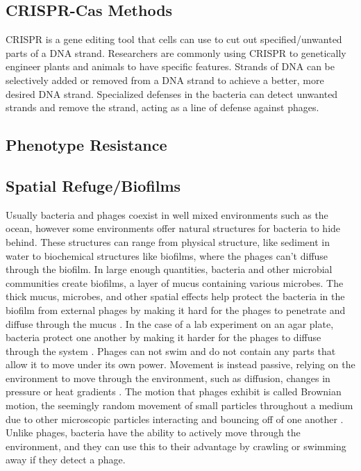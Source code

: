 \subsection{CRISPR-Cas Methods}
CRISPR is a gene editing tool that cells can use to cut out specified/unwanted parts of a DNA strand. 
Researchers are commonly using CRISPR to genetically engineer plants and animals to have specific features. 
Strands of DNA can be selectively added or removed from a DNA strand to achieve a better, more desired DNA strand. 
Specialized defenses in the bacteria can detect unwanted strands and remove the strand, acting as a line of defense against phages. 

\subsection{Phenotype Resistance}

\subsection{Spatial Refuge/Biofilms} 
Usually bacteria and phages coexist in well mixed environments such as the ocean, however some environments offer natural structures for bacteria to hide behind. 
These structures can range from physical structure, like sediment in water to biochemical structures like biofilms, where the phages can't diffuse through the biofilm. 
In large enough quantities, bacteria and other microbial communities create biofilms, a layer of mucus containing various microbes. 
The thick mucus, microbes, and other spatial effects help protect the bacteria in the biofilm from external phages by making it hard for the phages to penetrate and diffuse through the mucus \cite{abedonPhageDelayEnhancing2017}. 
In the case of a lab experiment on an agar plate, bacteria protect one another by making it harder for the phages to diffuse through the system \cite{eriksenGrowingMicrocolonyCan2018}. \newline
Phages can not swim and do not contain any parts that allow it to move under its own power. 
Movement is instead passive, relying on the environment to move through the environment, such as diffusion, changes in pressure or heat gradients \cite{lohrmannInfluenceBacterialSwimming2024}. 
The motion that phages exhibit is called Brownian motion, the seemingly random movement of small particles throughout a medium due to other microscopic particles interacting and bouncing off of one another \cite{moineauBacteriophage2013}. 
Unlike phages, bacteria have the ability to actively move through the environment, and they can use this to their advantage by crawling or swimming away if they detect a phage. 

